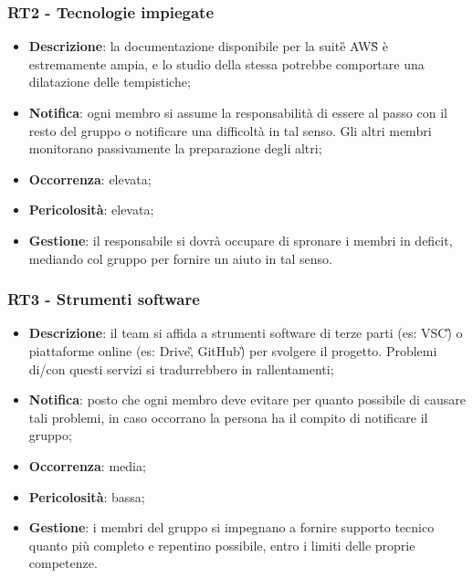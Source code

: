 	\subsubsection*{RT2 - Tecnologie impiegate}
	\begin{itemize}
		\item \textbf{Descrizione}: la documentazione disponibile per la suite\G{} AWS\G{} è estremamente ampia, e lo studio della stessa potrebbe comportare una dilatazione delle tempistiche;
		\item \textbf{Notifica}: ogni membro si assume la responsabilità di essere al passo con il resto del gruppo o notificare una difficoltà in tal senso. Gli altri membri monitorano passivamente la preparazione degli altri;
		\item \textbf{Occorrenza}: elevata;
		\item \textbf{Pericolosità}: elevata;
		\item \textbf{Gestione}: il responsabile si dovrà occupare di spronare i membri in deficit, mediando col gruppo per fornire un aiuto in tal senso.
	\end{itemize}

   \subsubsection*{RT3 - Strumenti software}
   \begin{itemize}
   	\item \textbf{Descrizione}: il team si affida a strumenti software di terze parti (es: VSC\G) o piattaforme online (es: Drive\G, GitHub\G) per svolgere il progetto. Problemi di/con questi servizi si tradurrebbero in rallentamenti;
   	\item \textbf{Notifica}: posto che ogni membro deve evitare per quanto possibile di causare tali problemi, in caso occorrano la persona ha il compito di notificare il gruppo;
   	\item \textbf{Occorrenza}: media;
   	\item \textbf{Pericolosità}: bassa;
   	\item \textbf{Gestione}: i membri del gruppo si impegnano a fornire supporto tecnico quanto più completo e repentino possibile, entro i limiti delle proprie competenze.
   \end{itemize}

